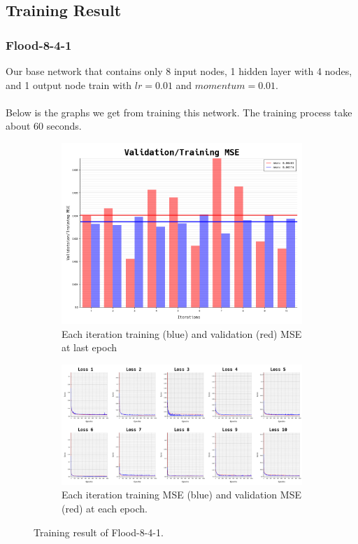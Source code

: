 \documentclass{article}
\begin{document}
\subsection*{Training Result}
\subsubsection*{Flood-8-4-1}
Our base network that contains only 8 input nodes, 1 hidden layer with 4 nodes, and 1 output node train with $lr = 0.01$ and $momentum = 0.01$.
\\ \\
Below is the graphs we get from training this network. The training process take about $60$ seconds.
\begin{figure}[ht]
	\begin{subfigure}{\textwidth}
		\centering
		\includegraphics[scale=0.3]{flood-8-4-1/cv_l}
		\caption{Each iteration training (blue) and validation (red) MSE at last epoch}
	\end{subfigure}
	\begin{subfigure}{\textwidth}
		\includegraphics[width=\textwidth]{flood-8-4-1/loss}
		\caption{Each iteration training MSE (blue) and validation MSE (red) at each epoch.}
	\end{subfigure}
	\caption{Training result of Flood-8-4-1.}
	\label{fig:2}
\end{figure}
\FloatBarrier
\end{document}
